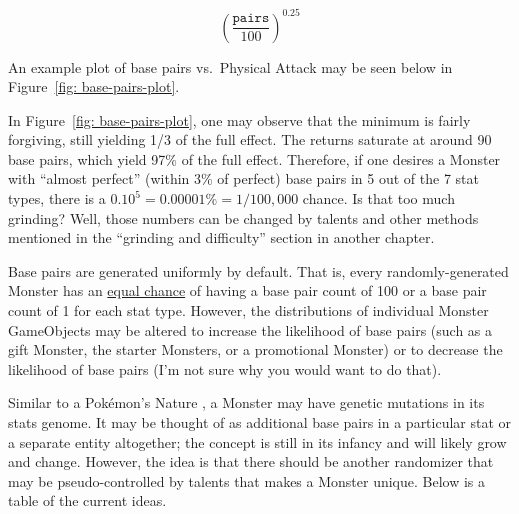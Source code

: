 \begin{equation}\label{eqn: base-pair-contribution}
		\left(\frac{\texttt{pairs}}{100}\right)^{0.25}
\end{equation}


An example plot of base pairs vs.\ Physical Attack may be seen below in Figure~\ref{fig: base-pairs-plot}. 


In Figure~\ref{fig: base-pairs-plot}, one may observe that the minimum is fairly forgiving, still yielding 1/3 of the full effect. The returns saturate at around 90 base pairs, which yield 97\% of the full effect. Therefore, if one desires a Monster with ``almost perfect'' (within 3\% of perfect) base pairs in 5 out of the 7 stat types, there is a $0.10^5 = 0.00001\% = 1/100,000$ chance. Is that too much grinding? Well, those numbers can be changed by talents and other methods mentioned in the ``grinding and difficulty'' section in another chapter.

Base pairs are generated uniformly by default. That is, every randomly-generated Monster has an \ul{equal chance} of having a base pair count of 100 or a base pair count of 1 for each stat type. However, the distributions of individual Monster GameObjects may be altered to increase the likelihood of base pairs (such as a gift Monster, the starter Monsters, or a promotional Monster) or to decrease the likelihood of base pairs (I'm not sure why you would want to do that).




\newpage
{}
Similar to a Pok\'{e}mon's Nature \cite{pkmn-stats}, a Monster may have genetic mutations in its stats genome. It may be thought of as additional base pairs in a particular stat or a separate entity altogether; the concept is still in its infancy and will likely grow and change. However, the idea is that there should be another randomizer that may be pseudo-controlled by talents that makes a Monster unique. Below is a table of the current ideas.


